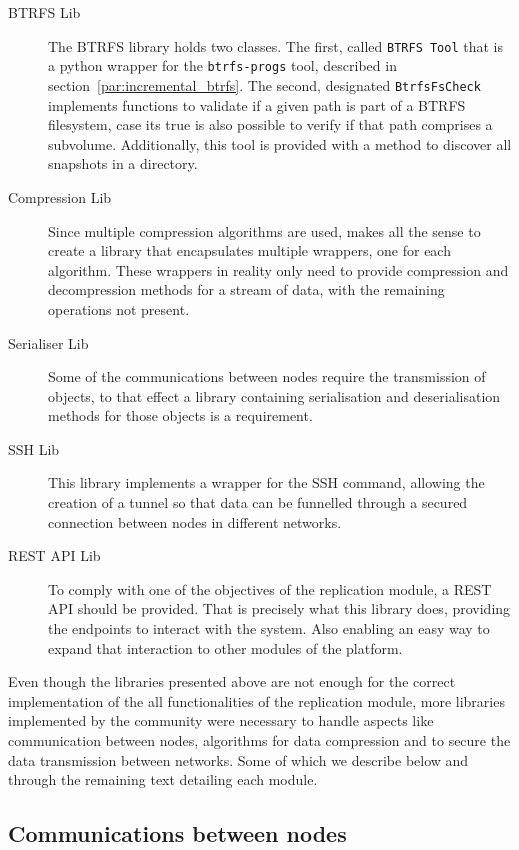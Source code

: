 \begin{description}
	\item [BTRFS Lib] The BTRFS library holds two classes. The first, called \texttt{BTRFS Tool} that is a python wrapper for the \texttt{btrfs-progs} tool, described in section~\ref{par:incremental_btrfs}. The second, designated \texttt{BtrfsFsCheck} implements functions to validate if a given path is part of a BTRFS filesystem, case its true is also possible to verify if that path comprises a subvolume. Additionally, this tool is provided with a method to discover all snapshots in a directory.
	\item [Compression Lib] Since multiple compression algorithms are used, makes all the sense to create a library that encapsulates multiple wrappers, one for each algorithm. These wrappers in reality only need to provide compression and decompression methods for a stream of data, with the remaining operations not present.
	\item [Serialiser Lib] Some of the communications between nodes require the transmission of objects, to that effect a library containing serialisation and deserialisation methods for those objects is a requirement.
	\item [SSH Lib] This library implements a wrapper for the SSH command, allowing the creation of a tunnel so that data can be funnelled through a secured connection between nodes in different networks.
	\item [REST API Lib] To comply with one of the objectives of the replication module, a REST API should be provided. That is precisely what this library does, providing the endpoints to interact with the system. Also enabling an easy way to expand that interaction to other modules of the platform.

\end{description}

Even though the libraries presented above are not enough for the correct implementation of the all functionalities of the replication module, more libraries implemented by the community were necessary to handle aspects like communication between nodes, algorithms for data compression and to secure the data transmission between networks. Some of which we describe below and through the remaining text detailing each module.


\subsection{Communications between nodes}
\label{sub:rep_comms}

